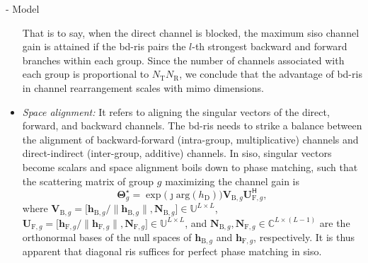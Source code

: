 \documentclass[journal]{IEEEtran}
\begin{document}
\begin{section}{- Model}
\begin{itemize}
		That is to say, when the direct channel is blocked,
		the maximum \gls{siso} channel gain is attained if the \gls{bd}-\gls{ris} pairs the $l$-th strongest backward and forward branches within each group.
		Since the number of channels associated with each group is proportional to $N_\mathrm{T} N_\mathrm{R}$, we conclude that {the advantage of \gls{bd}-\gls{ris} in channel rearrangement scales with \gls{mimo} dimensions.}
		\item \emph{Space alignment:} It refers to aligning the singular vectors of the direct, forward, and backward channels.
		The \gls{bd}-\gls{ris} needs to strike a balance between the alignment of backward-forward (intra-group, multiplicative) channels and direct-indirect (inter-group, additive) channels. In \gls{siso}, singular vectors become scalars and space alignment boils down to phase matching, such that the scattering matrix of group $g$ maximizing the channel gain is
		\begin{equation}
			\mathbf{\Theta}_g^\star = \exp \bigl(\jmath \mathrm{arg}(h_\mathrm{D})\bigr) \mathbf{V}_{\mathrm{B},g} \mathbf{U}_{\mathrm{F},g}^\mathsf{H},
			\label{eq:scattering_siso}
		\end{equation}
		where $\mathbf{V}_{\mathrm{B},g} = \bigl[\mathbf{h}_{\mathrm{B},g}/\lVert \mathbf{h}_{\mathrm{B},g} \rVert, \mathbf{N}_{\mathrm{B},g}\bigr] \in \mathbb{U}^{L \times L}$, $\mathbf{U}_{\mathrm{F},g} = \bigl[\mathbf{h}_{\mathrm{F},g}/\lVert \mathbf{h}_{\mathrm{F},g} \rVert, \mathbf{N}_{\mathrm{F},g}\bigr] \in \mathbb{U}^{L \times L}$, and $\mathbf{N}_{\mathrm{B},g}, \mathbf{N}_{\mathrm{F},g} \in \mathbb{C}^{L \times (L-1)}$ are the orthonormal bases of the null spaces of $\mathbf{h}_{\mathrm{B},g}$ and $\mathbf{h}_{\mathrm{F},g}$, respectively.
		It is thus apparent that diagonal \gls{ris} suffices
		for perfect phase matching in \gls{siso}.

\end{itemize}
\end{section}
\end{document}

